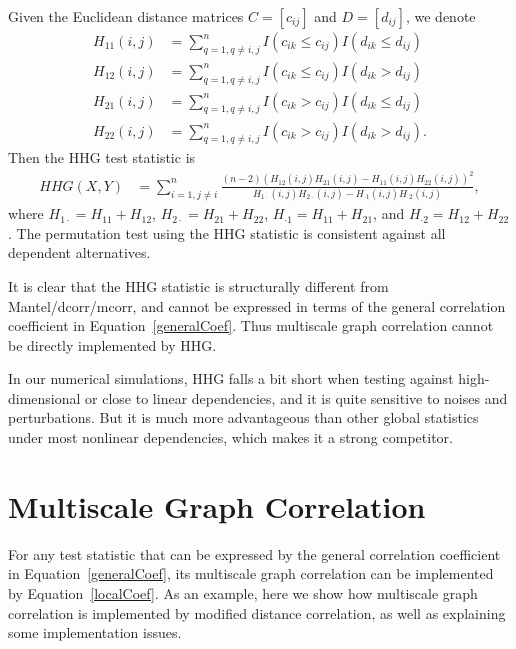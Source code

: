 \documentclass[11pt]{article}
\begin{document}
Given the Euclidean distance matrices $C=[c_{ij}]$ and $D=[d_{ij}]$, we denote
\begin{align*}
H_{11}(i,j) &= \sum_{q=1,q\neq i,j}^{n}I(c_{ik} \leq c_{ij})I(d_{ik} \leq d_{ij}) \\
H_{12}(i,j) &= \sum_{q=1,q\neq i,j}^{n}I(c_{ik} \leq c_{ij})I(d_{ik} > d_{ij}) \\
H_{21}(i,j) &= \sum_{q=1,q\neq i,j}^{n}I(c_{ik} > c_{ij})I(d_{ik} \leq d_{ij}) \\
H_{22}(i,j) &= \sum_{q=1,q\neq i,j}^{n}I(c_{ik} > c_{ij})I(d_{ik} > d_{ij}).
\end{align*}
Then the HHG test statistic is
\begin{align*}
HHG(X,Y) &= \sum_{i=1,j\neq i}^{n} \frac{(n-2)(H_{12}(i,j)H_{21}(i,j)-H_{11}(i,j)H_{22}(i,j))^2}{H_{1 \cdot}(i,j)H_{2 \cdot}(i,j)-H_{\cdot 1}(i,j)H_{\cdot 2}(i,j)},
\end{align*}
where $H_{1 \cdot}=H_{11}+H_{12}$, $H_{2 \cdot}=H_{21}+H_{22}$, $H_{\cdot 1}=H_{11}+H_{21}$, and $H_{\cdot 2}=H_{12}+H_{22}$. The permutation test using the HHG statistic is consistent against all dependent alternatives.

It is clear that the HHG statistic is structurally different from Mantel/dcorr/mcorr, and cannot be expressed in terms of the general correlation coefficient in Equation~\ref{generalCoef}. Thus multiscale graph correlation cannot be directly implemented by HHG.

In our numerical simulations, HHG falls a bit short when testing against high-dimensional or close to linear dependencies, and it is quite sensitive to noises and perturbations. But it is much more advantageous than other global statistics under most nonlinear dependencies, which makes it a strong competitor. %

\section{Multiscale Graph Correlation}
\label{appen:MGC}

For any test statistic that can be expressed by the general correlation coefficient in Equation~\ref{generalCoef}, its multiscale graph correlation can be implemented by Equation~\ref{localCoef}. As an example, here we show how multiscale graph correlation is implemented by modified distance correlation, as well as explaining some implementation issues.
\end{document}
